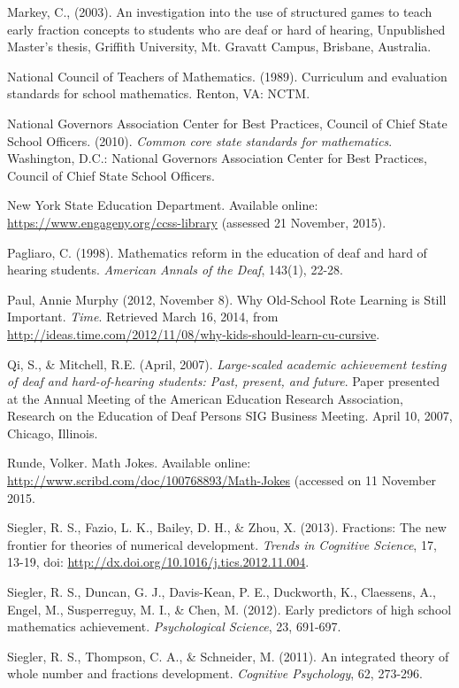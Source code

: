 \documentclass[11.5pt]{sig-alternate} %
\begin{document}
Markey, C., (2003). An investigation into the use of structured games to teach early fraction concepts to students who are deaf or hard of hearing, Unpublished Master's thesis, Griffith University, Mt. Gravatt Campus, Brisbane, Australia.

National Council of Teachers of Mathematics. (1989). Curriculum and evaluation standards for school mathematics. Renton, VA: NCTM.

National Governors Association Center for Best Practices, Council of Chief State School Officers. (2010). \textit{Common core state standards for mathematics}. Washington, D.C.: National Governors Association Center for Best Practices, Council of Chief State School Officers.

New York State Education Department. Available online: \url{https://www.engageny.org/ccss-library} (assessed 21 November, 2015).

Pagliaro, C. (1998). Mathematics reform in the education of deaf and hard of hearing students. \textit{American Annals of the Deaf}, 143(1), 22-28.

Paul, Annie Murphy (2012, November 8). Why Old-School Rote Learning is Still Important. \textit{Time}. Retrieved March 16, 2014, from \url{http://ideas.time.com/2012/11/08/why-kids-should-learn-cu-cursive}.

Qi, S., \& Mitchell, R.E. (April, 2007). \textit{Large-scaled academic achievement testing of deaf and hard-of-hearing students: Past, present, and future}. Paper presented at the Annual Meeting of the American Education Research Association, Research on the Education of Deaf Persons SIG Business Meeting. April 10, 2007, Chicago, Illinois.

Runde, Volker. Math Jokes. Available online: \url{http://www.scribd.com/doc/100768893/Math-Jokes} (accessed on 11 November 2015.

Siegler, R. S., Fazio, L. K., Bailey, D. H., \& Zhou, X. (2013). Fractions: The new frontier for theories of numerical development. \textit{Trends in Cognitive Science}, 17, 13-19, doi: \url{http://dx.doi.org/10.1016/j.tics.2012.11.004}.

Siegler, R. S., Duncan, G. J., Davis-Kean, P. E., Duckworth, K., Claessens, A., Engel, M., Susperreguy, M. I., \& Chen, M. (2012). Early predictors of high school mathematics achievement. \textit{Psychological Science}, 23, 691-697.

Siegler, R. S., Thompson, C. A., \& Schneider, M. (2011). An integrated theory of whole number and fractions development. \textit{Cognitive Psychology}, 62, 273-296.
\end{document}
